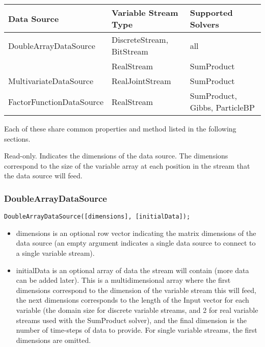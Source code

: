 \begin{longtable} {l | l | l}
Data Source & Variable Stream Type & Supported Solvers \\
\hline
\endhead
DoubleArrayDataSource & DiscreteStream, BitStream & all \\
 & RealStream & SumProduct \\
MultivariateDataSource & RealJointStream & SumProduct \\
FactorFunctionDataSource & RealStream & SumProduct, Gibbs, ParticleBP \\
\end{longtable} 

Each of these share common properties and method listed in the following sections.


\ifmatlab
{}

Read-only.  Indicates the dimensions of the data source.  The dimensions correspond to the size of the variable array at each position in the stream that the data source will feed.
\fi

\subsubsection{DoubleArrayDataSource}


\ifmatlab
\begin{lstlisting}
DoubleArrayDataSource([dimensions], [initialData]);
\end{lstlisting}

\begin{itemize}
\item dimensions is an optional row vector indicating the matrix dimensions of the data source (an empty argument indicates a single data source to connect to a single variable stream).
\item initialData is an optional array of data the stream will contain (more data can be added later).  This is a multidimensional array where the first dimensions correspond to the dimension of the variable stream this will feed, the next dimensions corresponds to the length of the Input vector for each variable (the domain size for discrete variable streams, and 2 for real variable streams used with the SumProduct solver), and the final dimension is the number of time-steps of data to provide.  For single variable streams, the first dimensions are omitted.
\end{itemize}
\fi

